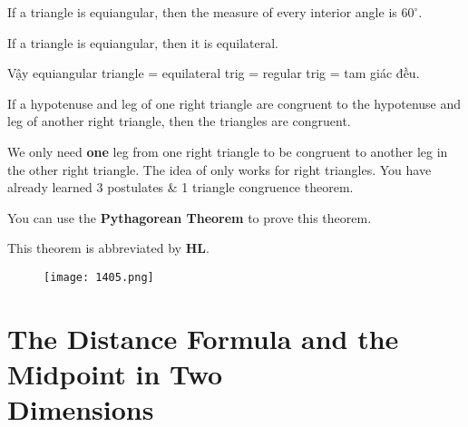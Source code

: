 \begin{tcolorbox}[colback=red!5!white,colframe=red!75!black,title=The Equiangular Triangle Theorem]
  If a triangle is equiangular, then the measure of every interior angle is $60^{\circ}$.
\end{tcolorbox}

\vspace{.4cm}

\begin{tcolorbox}[colback=red!5!white,colframe=red!75!black,title=The Equilateral Triangle Converse Theorem]
  If a triangle is equiangular, then it is equilateral.
\end{tcolorbox}

Vậy equiangular triangle = equilateral trig = regular trig = tam giác đều.

\vspace{.5cm}

\begin{tcolorbox}[colback=red!5!white,colframe=red!75!black,title=The Hypotenuse-Leg Congruence Theorem]
  If a hypotenuse and leg of one right triangle are congruent to the hypotenuse and leg of another right triangle, then the triangles are congruent.
\end{tcolorbox}

We only need \textbf{one} leg from one right triangle to be congruent to another leg in the other right triangle. The idea of  only works for right triangles. You have already learned 3 postulates \& 1 triangle congruence theorem.

You can use the \textbf{Pythagorean Theorem} to prove this theorem.

This theorem is abbreviated by \textbf{HL}.

\newpage

\begin{figure}[htb!]
  \centering
  \texttt{[image: 1405.png]}
\end{figure}

\section{The Distance Formula and the Midpoint in Two\\ Dimensions}

